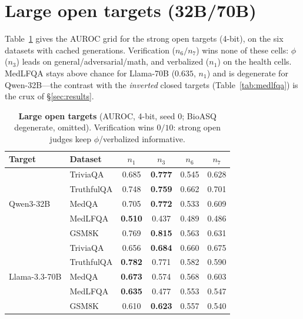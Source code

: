 \documentclass[11pt]{article}
\newcommand{\nverb}{$n_1$}     %
\newcommand{\nphi}{$n_3$}      %
\newcommand{\nyn}{$n_6$}       %
\newcommand{\nsc}{$n_7$}       %
\begin{document}
\section{Large open targets (32B/70B)}\label{app:bigopen}
Table~\ref{tab:bigopen} gives the AUROC grid for the strong open targets (4-bit), on the six
datasets with cached generations. Verification ($n_6/n_7$) wins none of these cells: $\phi$
($n_3$) leads on general/adversarial/math, and verbalized ($n_1$) on the health cells. MedLFQA
stays above chance for Llama-70B ($0.635$, $n_1$) and is degenerate for Qwen-32B---the contrast
with the \emph{inverted} closed targets (Table~\ref{tab:medlfqa}) is the crux of
\S\ref{sec:results}.
\begin{table}[h]
\centering\small
\begin{tabular}{llcccc}
\toprule
Target & Dataset & \nverb & \nphi & \nyn & \nsc \\
\midrule
\multirow{5}{*}{Qwen3-32B}
 & TriviaQA   & 0.685 & \textbf{0.777} & 0.545 & 0.628 \\
 & TruthfulQA & 0.748 & \textbf{0.759} & 0.662 & 0.701 \\
 & MedQA      & 0.705 & \textbf{0.772} & 0.533 & 0.609 \\
 & MedLFQA    & \textbf{0.510} & 0.437 & 0.489 & 0.486 \\
 & GSM8K      & 0.769 & \textbf{0.815} & 0.563 & 0.631 \\
\midrule
\multirow{5}{*}{Llama-3.3-70B}
 & TriviaQA   & 0.656 & \textbf{0.684} & 0.660 & 0.675 \\
 & TruthfulQA & \textbf{0.782} & 0.771 & 0.582 & 0.590 \\
 & MedQA      & \textbf{0.673} & 0.574 & 0.568 & 0.603 \\
 & MedLFQA    & \textbf{0.635} & 0.477 & 0.553 & 0.547 \\
 & GSM8K      & 0.610 & \textbf{0.623} & 0.557 & 0.540 \\
\bottomrule
\end{tabular}
\caption{\textbf{Large open targets} (AUROC, 4-bit, seed 0; BioASQ degenerate, omitted).
Verification wins $0/10$: strong open judges keep $\phi$/verbalized informative.}
\label{tab:bigopen}
\end{table}
\end{document}
